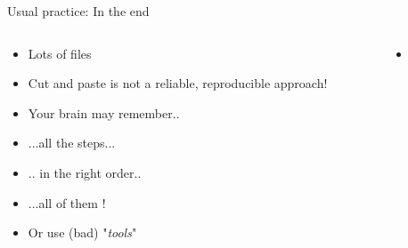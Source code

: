 \documentclass[xcolor=x11names,compress]{beamer}
\renewcommand{\(}{\begin{columns}}
\renewcommand{\)}{\end{columns}}
\newcommand{\<}[1]{\begin{column}{#1}}
\renewcommand{\>}{\end{column}}
\begin{document}
\begin{frame}{Usual practice: In the end}

 \begin{columns}[T]
    \begin{column}{0.5\textwidth}
      \begin{itemize}[<+->]
        \item Lots of files
        \item Cut and paste is not a reliable, reproducible approach!
        \item Your brain may remember..
        \item[] ...all the steps...
        \item[] .. in the right order..
        \item[]...all of them !
        \item Or use (bad) "\emph{tools}"
      \end{itemize}
    \end{column}
    \begin{column}{0.5\textwidth}
       \begin{itemize}
       \item[] 

\end{itemize}
\end{column}
\end{columns}
\end{frame}
\end{document}
